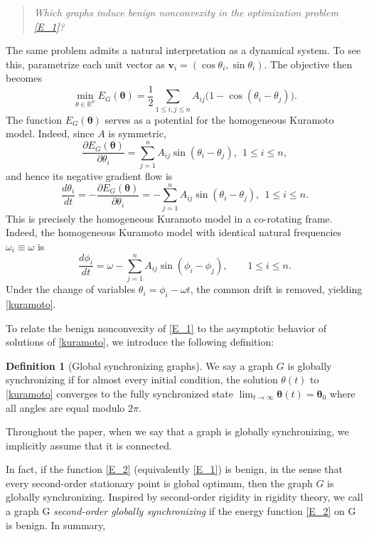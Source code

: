\documentclass[11pt,reqno]{amsart}
\theoremstyle{definition}
\newtheorem{definition}[theorem]{Definition}
\begin{document}
\begin{quote}
\textit{Which graphs induce benign nonconvexity in the optimization problem \eqref{E_1}?}
\end{quote}
The same problem admits a natural interpretation as a dynamical system. 
To see this, parametrize each unit vector as 
$\boldsymbol v_i=(\cos\theta_i,\sin\theta_i)$. The objective then becomes
\begin{equation}\label{E_2}
\min_{\theta
\in\mathbb{R}^n}
E_G(\boldsymbol\theta)
=
\frac{1}{2}
\sum_{1\le i,j\le n}
A_{ij}\bigl(1-\cos(\theta_i-\theta_j)\bigr).
\end{equation}
The function $E_G(\boldsymbol \theta)$ serves as a potential for the homogeneous Kuramoto model. 
Indeed, since $A$ is symmetric,
\[
\frac{\partial E_G(\boldsymbol \theta)}{\partial \theta_i}
=
\sum_{j=1}^n A_{ij}\sin(\theta_i-\theta_j),
\ \ 1\le i\le n,
\]
and hence its negative gradient flow is
\begin{equation}\label{kuramoto}
    \frac{d\theta_i}{dt}
    =
    -\frac{\partial E_G(\boldsymbol \theta)}{\partial \theta_i}
    =
    -\sum_{j=1}^n A_{ij}\sin(\theta_i-\theta_j),
\ \ 1\le i\le n.
\end{equation}
This is precisely the homogeneous Kuramoto model in a co-rotating frame.
Indeed, the homogeneous Kuramoto model with identical natural frequencies
$\omega_i\equiv\omega$ is
\[
\frac{d\phi_i}{dt}
=
\omega
-
\sum_{j=1}^n A_{ij}\sin(\phi_i-\phi_j),
\qquad 1\le i\le n.
\]
Under the change of variables
$\theta_i=\phi_i-\omega t$, the common drift is removed, yielding
\eqref{kuramoto}.

To relate the benign nonconvexity of \eqref{E_1} to the asymptotic behavior of solutions of \eqref{kuramoto}, we introduce the following definition:
\begin{definition}[Global synchronizing graphs]
    We say a graph $G$ is globally synchronizing if for almost every initial condition, the solution $\theta(t)$ to \eqref{kuramoto} converges to the fully synchronized state $\lim_{t \to \infty} \boldsymbol \theta(t) = \boldsymbol \theta_0$ where all angles are equal modulo \(2\pi\).
\end{definition}
Throughout the paper, when we say that a graph is globally synchronizing, we implicitly assume that it is connected.

In fact, if the function \eqref{E_2} (equivalently \eqref{E_1}) is benign, in the sense that every second-order stationary point is global optimum, then the graph \(G\) is globally synchronizing. Inspired by second-order rigidity in rigidity theory, we call a graph G \emph{second-order globally synchronizing} if the energy function \eqref{E_2} on G is benign. In summary,
\end{document}
